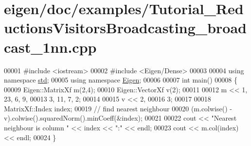 \hypertarget{eigen_2doc_2examples_2_tutorial___reductions_visitors_broadcasting__broadcast__1nn_8cpp_source}{}\section{eigen/doc/examples/\+Tutorial\+\_\+\+Reductions\+Visitors\+Broadcasting\+\_\+broadcast\+\_\+1nn.cpp}
\label{eigen_2doc_2examples_2_tutorial___reductions_visitors_broadcasting__broadcast__1nn_8cpp_source}

\begin{DoxyCode}
00001 \textcolor{preprocessor}{#include <iostream>}
00002 \textcolor{preprocessor}{#include <Eigen/Dense>}
00003 
00004 \textcolor{keyword}{using namespace }\hyperlink{namespacestd}{std};
00005 \textcolor{keyword}{using namespace }\hyperlink{namespace_eigen}{Eigen};
00006 
00007 \textcolor{keywordtype}{int} main()
00008 \{
00009   Eigen::MatrixXf m(2,4);
00010   Eigen::VectorXf v(2);
00011   
00012   m << 1, 23, 6, 9,
00013        3, 11, 7, 2;
00014        
00015   v << 2,
00016        3;
00017 
00018   MatrixXf::Index index;
00019   \textcolor{comment}{// find nearest neighbour}
00020   (m.colwise() - v).colwise().squaredNorm().minCoeff(&index);
00021 
00022   cout << \textcolor{stringliteral}{"Nearest neighbour is column "} << index << \textcolor{stringliteral}{":"} << endl;
00023   cout << m.col(index) << endl;
00024 \}
\end{DoxyCode}
